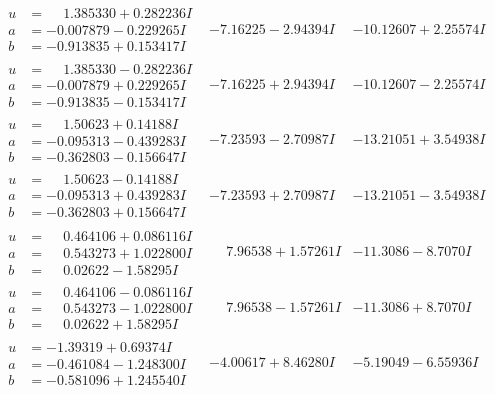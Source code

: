 \documentclass[1p]{elsarticle_modified}
\theoremstyle{definition}
\begin{document}
$$\begin{array}{c|c|c}
\begin{aligned}
u &= \phantom{-}1.385330 + 0.282236 I \\
a &= -0.007879 - 0.229265 I \\
b &= -0.913835 + 0.153417 I\end{aligned}
 & -7.16225 - 2.94394 I & -10.12607 + 2.25574 I \\ \hline\begin{aligned}
u &= \phantom{-}1.385330 - 0.282236 I \\
a &= -0.007879 + 0.229265 I \\
b &= -0.913835 - 0.153417 I\end{aligned}
 & -7.16225 + 2.94394 I & -10.12607 - 2.25574 I \\ \hline\begin{aligned}
u &= \phantom{-}1.50623 + 0.14188 I \\
a &= -0.095313 - 0.439283 I \\
b &= -0.362803 - 0.156647 I\end{aligned}
 & -7.23593 - 2.70987 I & -13.21051 + 3.54938 I \\ \hline\begin{aligned}
u &= \phantom{-}1.50623 - 0.14188 I \\
a &= -0.095313 + 0.439283 I \\
b &= -0.362803 + 0.156647 I\end{aligned}
 & -7.23593 + 2.70987 I & -13.21051 - 3.54938 I \\ \hline\begin{aligned}
u &= \phantom{-}0.464106 + 0.086116 I \\
a &= \phantom{-}0.543273 + 1.022800 I \\
b &= \phantom{-}0.02622 - 1.58295 I\end{aligned}
 & \phantom{-}7.96538 + 1.57261 I & -11.3086 - 8.7070 I \\ \hline\begin{aligned}
u &= \phantom{-}0.464106 - 0.086116 I \\
a &= \phantom{-}0.543273 - 1.022800 I \\
b &= \phantom{-}0.02622 + 1.58295 I\end{aligned}
 & \phantom{-}7.96538 - 1.57261 I & -11.3086 + 8.7070 I \\ \hline\begin{aligned}
u &= -1.39319 + 0.69374 I \\
a &= -0.461084 - 1.248300 I \\
b &= -0.581096 + 1.245540 I\end{aligned}
 & -4.00617 + 8.46280 I & -5.19049 - 6.55936 I \\ \hline\begin{aligned}

\end{aligned}
\end{array}$$
\end{document}
